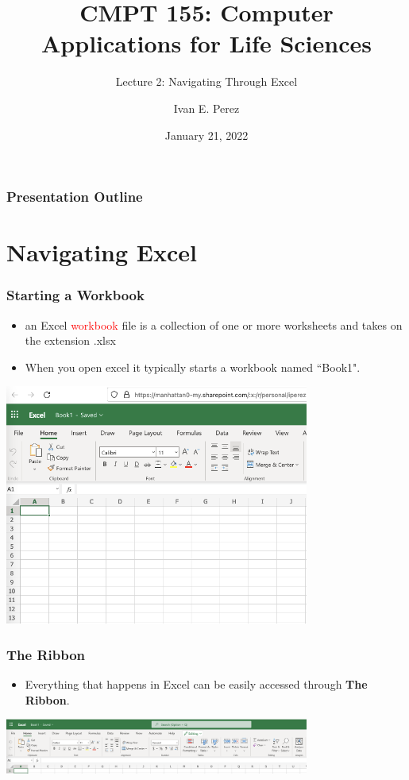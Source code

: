 \documentclass[12pt]{beamer}
\title{CMPT 155: Computer Applications for Life Sciences}
\subtitle{Lecture 2: Navigating Through Excel}
\author{Ivan E. Perez}
\institute{}
\date{January 21, 2022}
\begin{document}
	\begin{frame}
		\titlepage
	\end{frame}
	
	\begin{frame}
		\frametitle{Presentation Outline}
		\tableofcontents
		
	\end{frame}
	
	\section{Navigating Excel}
	
	\begin{frame}
		\frametitle{Starting a Workbook}
		\begin{itemize}
			\item an Excel \textcolor{red}{workbook} file is a collection of one or more worksheets and takes on the extension .xlsx
			\item When you open excel it typically starts a workbook named ``Book1".  
		\end{itemize} 
		\begin{center}
			\includegraphics[width=10cm]{Workbook.png}
		\end{center}
	\end{frame}
	
	\begin{frame}
		\frametitle{The Ribbon}
		\begin{itemize}
			\item Everything that happens in Excel can be easily accessed through \textbf{The Ribbon}.			
		\end{itemize}
		\begin{center}
			\includegraphics[width=10cm]{Ribbon.png}
		\end{center}	
\end{frame}
	
\end{document}
